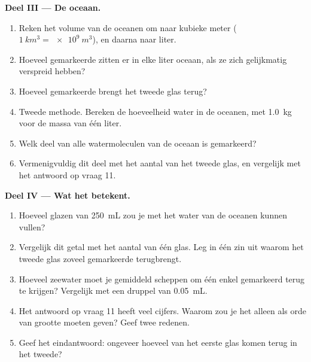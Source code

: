 \begin{problem}
\medskip
\noindent\textbf{Deel III --- De oceaan.}
\begin{enumerate}[resume]
  \item Reken het volume van de oceanen om naar kubieke meter
        ($\qty{1}{km^3} = \qty{e9}{m^3}$), en daarna naar liter.
  \item Hoeveel gemarkeerde  zitten er in elke liter oceaan, als
        ze zich gelijkmatig verspreid hebben?
  \item Hoeveel gemarkeerde  brengt het tweede glas terug?
  \item Tweede methode. Bereken de hoeveelheid water in de oceanen, met
        \qty{1.0}{kg} voor de massa van één liter.
  \item Welk deel van alle watermoleculen van de oceaan is gemarkeerd?
  \item Vermenigvuldig dit deel met het aantal  van het tweede
        glas, en vergelijk met het antwoord op vraag 11.
\end{enumerate}

\medskip
\noindent\textbf{Deel IV --- Wat het betekent.}
\begin{enumerate}[resume]
  \item Hoeveel glazen van \qty{250}{mL} zou je met het water van de
        oceanen kunnen vullen?
  \item Vergelijk dit getal met het aantal  van één glas. Leg in
        één zin uit waarom het tweede glas zoveel gemarkeerde 
        terugbrengt.
  \item Hoeveel zeewater moet je gemiddeld scheppen om één enkel
        gemarkeerd  terug te krijgen? Vergelijk met een druppel
        van \qty{0.05}{mL}.
  \item Het antwoord op vraag 11 heeft veel cijfers. Waarom zou je het
        alleen als orde van grootte moeten geven? Geef twee redenen.
  \item Geef het eindantwoord: ongeveer hoeveel  van het eerste
        glas komen terug in het tweede?
\end{enumerate}
\end{problem}
